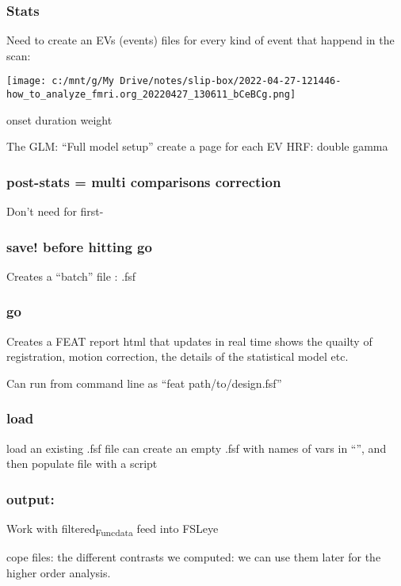 \documentclass[11pt]{article}
\begin{document}
\subsubsection{Stats}
\label{sec:orgd2f318b}
Need to create an EVs (events) files for every kind of event that happend in the scan:
\begin{center}
\texttt{[image: c:/mnt/g/My Drive/notes/slip-box/2022-04-27-121446-how\_to\_analyze\_fmri.org\_20220427\_130611\_bCeBCg.png]}
\end{center}
onset  duration weight

The GLM: ``Full model  setup''
create a page for each EV
HRF: double gamma

\subsubsection{post-stats = multi comparisons correction}
\label{sec:org3c655bc}
Don't need for first-

\subsubsection{save!  before hitting go}
\label{sec:org7ea1f8d}
Creates a ``batch'' file : .fsf

\subsubsection{go}
\label{sec:org6d3df76}
Creates a FEAT report html that updates in real time
shows the quailty of registration, motion correction, the details of the statistical model etc.

Can run from command line as ``feat path/to/design.fsf''

\subsubsection{load}
\label{sec:orgb4c42ba}
load an existing .fsf file
can create an empty .fsf with names of vars in ``'', and then populate file with a script


\subsubsection{output:}
\label{sec:orgb194ba1}
Work with filtered\textsubscript{Func}\textsubscript{data} feed into FSLeye

cope files: the different contrasts we computed: we can use them later for the higher order analysis.
\end{document}
